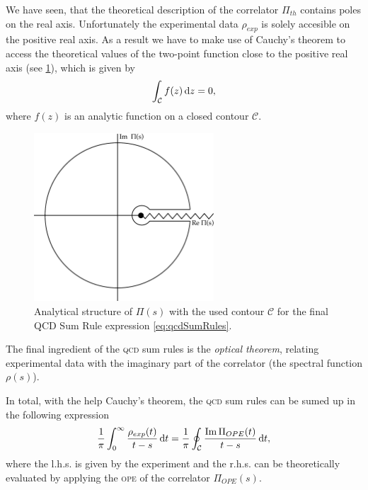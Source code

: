 \documentclass[../../index.tex]{subfiles}
\begin{document}
We have seen, that the theoretical description of the correlator $\Pi_{th}$
contains poles on the real axis. Unfortunately the experimental data $\rho_{exp}$ is
solely accesible on the positive real axis. As a result we have to make use of Cauchy's
theorem to access the theoretical values of the two-point function close to the
positive real axis (see \cref{fig:correlatorComplexContour}), which is given by
\begin{equation}
  \label{eq:cauchysTheorem}
  \int_{\mathcal{C}} f(z) \dif z = 0,
\end{equation}
where $f(z)$ is an analytic function on a closed contour $\mathcal{C}$.
\begin{figure}[h]
  \centering
  \label{fig:correlatorComplexContour}
  \includegraphics[width=0.6\textwidth]{./images/correlatorComplexContour.eps}
  \caption{Analytical structure of $\Pi(s)$ with the used contour $\mathcal{C}$
    for the final QCD Sum Rule expression \cref{eq:qcdSumRules}.}
\end{figure}

The final ingredient of the \textsc{qcd} sum rules is the \textit{optical
  theorem}, relating experimental data with the imaginary part of the correlator
(the spectral function $\rho(s)$).

In total, with the help Cauchy's theorem, the \textsc{qcd} sum rules can be
sumed up in the following expression
\begin{equation}
  \label{eq:qcdSumRules}
  \frac{1}{\pi}\int_0^\infty \frac{\rho_{exp}(t)}{t - s}\dif t = \frac{1}{\pi} \oint_{\mathcal{C}} \frac{\Ima \Pi_{OPE}(t)}{t -s}\dif t,
\end{equation}
where the l.h.s. is given by the experiment and the r.h.s. can be theoretically
evaluated by applying the \textsc{ope} of the correlator $\Pi_{OPE}(s)$.
\end{document}
